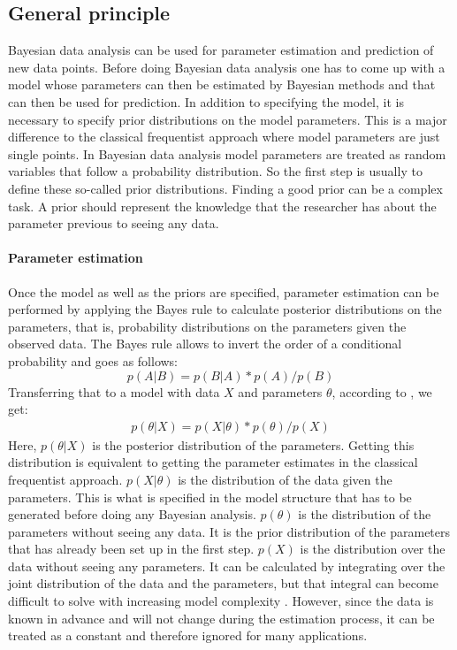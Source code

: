 \documentclass{article}
\begin{document}
\subsection{General principle}
\label{subsec: General principle}
Bayesian data analysis can be used for parameter estimation and prediction of new data points. Before doing Bayesian data analysis one has to come up with a model whose parameters can then be estimated by Bayesian methods and that can then be used for prediction. In addition to specifying the model, it is necessary to specify prior distributions on the model parameters. This is a major difference to the classical frequentist approach where model parameters are just single points. In Bayesian data analysis model parameters are treated as random variables that follow a probability distribution. So the first step is usually to define these so-called prior distributions. Finding a good prior can be a complex task. A prior should represent the knowledge that the researcher has about the parameter previous to seeing any data.
\paragraph{Parameter estimation}
Once the model as well as the priors are specified, parameter estimation can be performed by applying the Bayes rule to calculate posterior distributions on the parameters, that is, probability distributions on the parameters given the observed data. The Bayes rule allows to invert the order of a conditional probability and goes as follows:
\begin{equation}
p(A|B) = p(B|A) * p(A)/p(B)
\end{equation}
Transferring that to a model with data $X$ and parameters $\theta$, according to \cite{1439840954}, we get:
\begin{equation}
\label{eq:Bayes_formula}
\begin{split}
p(\theta|X) = p(X|\theta) * p(\theta)/p(X)
\end{split}
\end{equation}
Here, $p(\theta|X)$ is the posterior distribution of the parameters. Getting this distribution is equivalent to getting the parameter estimates in the classical frequentist approach. $p(X|\theta)$ is the distribution of the data given the parameters. This is what is specified in the model structure that has to be generated before doing any Bayesian analysis. $p(\theta)$ is the distribution of the parameters without seeing any data. It is the prior distribution of the parameters that has already been set up in the first step. $p(X)$ is the distribution over the data without seeing any parameters. It can be calculated by integrating over the joint distribution of the data and the parameters, but that integral can become difficult to solve with increasing model complexity \cite{1439840954}. However, since the data is known in advance and will not change during the estimation process, it can be treated as a constant and therefore ignored for many applications.
\end{document}

